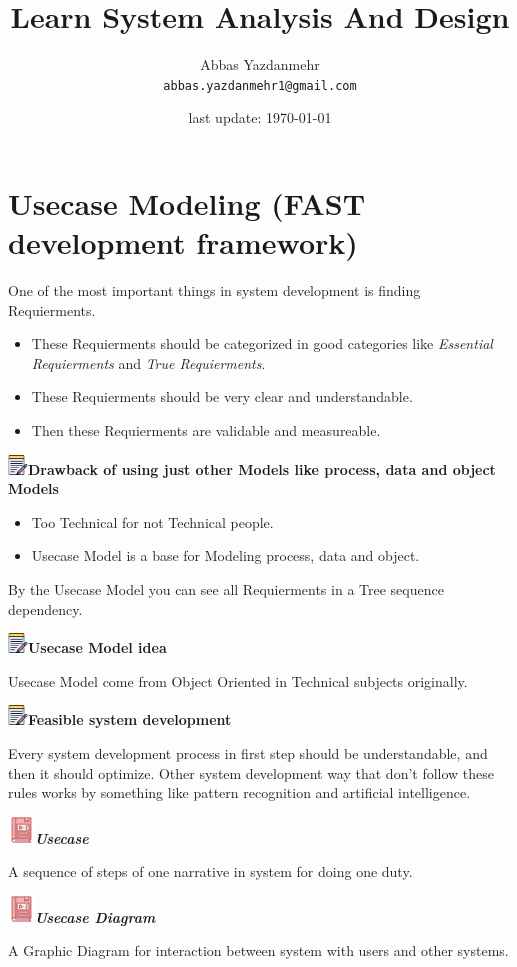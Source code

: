 \documentclass[a4paper, 12pt]{article}
\theoremstyle{definition}
\newcommand{\noticon}{\includegraphics[width=15pt]{constants/note.png}}
\newcommand{\deficon}{\includegraphics[width=20pt]{constants/def.png}}
\newcommand{\mynote}[1]{\vspace{10pt} 
\noindent
  \hspace{0.5em}\raisebox{-0.2em} \noticon \quad \textbf{\textcolor{blue1}{#1}} 
}
\newcommand{\mydef}[1]{\vspace{10pt} 
\noindent
  \hspace{0.5em}\raisebox{-0.3em} \deficon \quad \textit{\textbf{\textcolor{blue1}{#1}}} \quad
}
\begin{document}
\title{Learn System Analysis And Design}
\author{Abbas Yazdanmehr \\ \texttt{abbas.yazdanmehr1@gmail.com}}
\date{last update: \today}
\maketitle

\newpage

\tableofcontents

\newpage

\section{Usecase Modeling (FAST development framework)}
One of the most important things in system development is finding \textcolor{red1}{Requierments}.

\begin{itemize}
  \item These Requierments should be categorized in good categories like 
\textit{Essential Requierments} and \textit{True Requierments}.
  \item These Requierments should be very clear and understandable.
  \item Then these Requierments are validable and measureable.
\end{itemize}

\mynote{Drawback of using just other Models like process, data and object Models}
\begin{itemize}
  \item Too Technical for not Technical people.
  \item Usecase Model is a base for Modeling process, data and object.
\end{itemize}

By the Usecase Model you can see all Requierments in a Tree sequence dependency.

\mynote{Usecase Model idea}
Usecase Model come from Object Oriented in Technical subjects originally.

\mynote{Feasible system development}
Every system development process in first step should be understandable, and then
it should optimize. Other system development way that don't follow these rules works
by something like pattern recognition and artificial intelligence.

\mydef{Usecase}
A sequence of steps of one narrative in system for doing \textcolor{red1}{one duty}.

\mydef{Usecase Diagram}
A Graphic Diagram for interaction between system with users and other systems.
\end{document}
